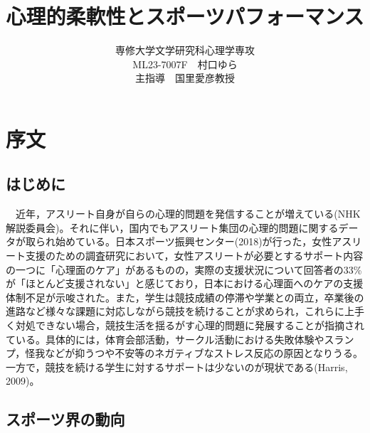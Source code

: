 \documentclass[12pt,a4paper,xelatex,ja=standard]{bxjsarticle}
\title{心理的柔軟性とスポーツパフォーマンス}
\author{専修大学文学研究科心理学専攻\\
ML23-7007F　村口ゆら\\
主指導　国里愛彦教授}
\date{}
\begin{document}
\pagestyle{empty}
\maketitle
\clearpage
{
\setcounter{tocdepth}{3}
\tableofcontents
}
\clearpage
\pagestyle{plain}
\setcounter{page}{1}

\hypertarget{ux5e8fux6587}{%
\section{序文}\label{ux5e8fux6587}}

\hypertarget{ux306fux3058ux3081ux306b}{%
\subsection{はじめに}\label{ux306fux3058ux3081ux306b}}

　近年，アスリート自身が自らの心理的問題を発信することが増えている(NHK解説委員会)。それに伴い，国内でもアスリート集団の心理的問題に関するデータが取られ始めている。日本スポーツ振興センター(2018)が行った，女性アスリート支援のための調査研究において，女性アスリートが必要とするサポート内容の一つに「心理面のケア」があるものの，実際の支援状況について回答者の33\%が「ほとんど支援されない」と感じており，日本における心理面へのケアの支援体制不足が示唆された。また，学生は競技成績の停滞や学業との両立，卒業後の進路など様々な課題に対応しながら競技を続けることが求められ，これらに上手く対処できない場合，競技生活を揺るがす心理的問題に発展することが指摘されている。具体的には，体育会部活動，サークル活動における失敗体験やスランプ，怪我などが抑うつや不安等のネガティブなストレス反応の原因となりうる。一方で，競技を続ける学生に対するサポートは少ないのが現状である(Harris,
2009)。

\hypertarget{ux30b9ux30ddux30fcux30c4ux754cux306eux52d5ux5411}{%
\subsection{スポーツ界の動向}\label{ux30b9ux30ddux30fcux30c4ux754cux306eux52d5ux5411}}
\end{document}
